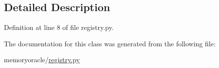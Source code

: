 \subsection{Detailed Description}


Definition at line 8 of file registry.\+py.



The documentation for this class was generated from the following file\+:\begin{DoxyCompactItemize}
\item 
memoryoracle/\hyperlink{registry_8py}{registry.\+py}\end{DoxyCompactItemize}
